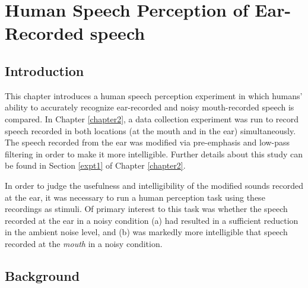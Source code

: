% 
% 
% 
% 

\chapter{Human Speech Perception of Ear-Recorded speech\label{chapter3}}


\section{Introduction}\label{chap3:introduction}

This chapter introduces a human speech perception experiment in which humans' ability to accurately recognize ear-recorded and noisy mouth-recorded speech is compared.  In Chapter \ref{chapter2}, a data collection experiment was run to record speech recorded in both locations (at the mouth and in the ear) simultaneously.  The speech recorded from the ear was modified via pre-emphasis and low-pass filtering in order to make it more intelligible.  Further details about this study can be found in Section \ref{expt1} of Chapter \ref{chapter2}.

In order to judge the usefulness and intelligibility of the modified sounds recorded at the ear, it was necessary to run a human perception task using these recordings as stimuli.  Of primary interest to this task was whether the speech recorded at the ear in a noisy condition (a) had resulted in a sufficient reduction in the ambient noise level, and (b) was markedly more intelligible that speech recorded at the \textit{mouth} in a noisy condition.

\section{Background}\label{chap3:background}

